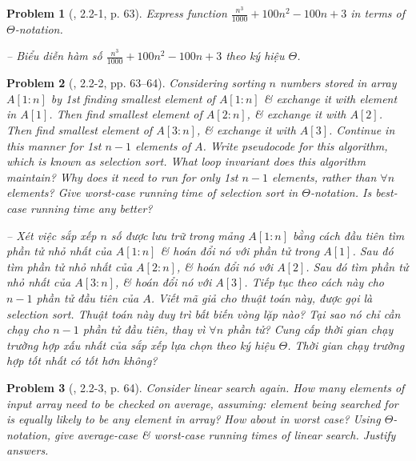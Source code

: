\documentclass{article}
\newtheorem{problem}{Problem}
\begin{document}
\begin{itemize}
\begin{itemize}
\begin{itemize}
            \begin{problem}[\cite{Cormen_Leiserson_Rivest_Stein_algorithm}, 2.2-1, p. 63]
                Express function $\frac{n^3}{1000} + 100n^2 - 100n + 3$ in terms of $\Theta$-notation.
                
                -- Biểu diễn hàm số $\frac{n^3}{1000} + 100n^2 - 100n + 3$ theo ký hiệu $\Theta$.
            \end{problem}
            
            \begin{problem}[\cite{Cormen_Leiserson_Rivest_Stein_algorithm}, 2.2-2, pp. 63--64]
                Considering sorting $n$ numbers stored in array $A[1:n]$ by 1st finding smallest element of $A[1:n]$ \& exchange it with element in $A[1]$. Then find smallest element of $A[2:n]$, \& exchange it with $A[2]$. Then find smallest element of $A[3:n]$, \& exchange it with $A[3]$. Continue in this manner for 1st $n - 1$ elements of $A$. Write pseudocode for this algorithm, which is known as {\rm selection sort}. What loop invariant does this algorithm maintain? Why does it need to run for only 1st $n - 1$ elements, rather than $\forall n$ elements? Give worst-case running time of selection sort in $\Theta$-notation. Is best-case running time any better?
                
                -- Xét việc sắp xếp $n$ số được lưu trữ trong mảng $A[1:n]$ bằng cách đầu tiên tìm phần tử nhỏ nhất của $A[1:n]$ \& hoán đổi nó với phần tử trong $A[1]$. Sau đó tìm phần tử nhỏ nhất của $A[2:n]$, \& hoán đổi nó với $A[2]$. Sau đó tìm phần tử nhỏ nhất của $A[3:n]$, \& hoán đổi nó với $A[3]$. Tiếp tục theo cách này cho $n - 1$ phần tử đầu tiên của $A$. Viết mã giả cho thuật toán này, được gọi là {\rm selection sort}. Thuật toán này duy trì bất biến vòng lặp nào? Tại sao nó chỉ cần chạy cho $n - 1$ phần tử đầu tiên, thay vì $\forall n$ phần tử? Cung cấp thời gian chạy trường hợp xấu nhất của sắp xếp lựa chọn theo ký hiệu $\Theta$. Thời gian chạy trường hợp tốt nhất có tốt hơn không?
            \end{problem}
            
            \begin{problem}[\cite{Cormen_Leiserson_Rivest_Stein_algorithm}, 2.2-3, p. 64]
                Consider linear search again. How many elements of input array need to be checked on average, assuming: element being searched for is equally likely to be any element in array? How about in worst case? Using $\Theta$-notation, give average-case \& worst-case running times of linear search. Justify answers.
                

\end{problem}
\end{itemize}
\end{itemize}
\end{itemize}
\end{document}
